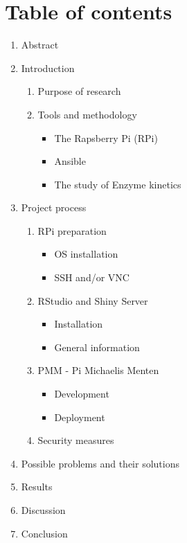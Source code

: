 \hypertarget{table-of-contents}{%
\section{Table of contents}\label{table-of-contents}}

\begin{enumerate}
\def\labelenumi{\arabic{enumi}.}
\tightlist
\item
  Abstract
\item
  Introduction

  \begin{enumerate}
  \def\labelenumii{\arabic{enumii}.}
  \tightlist
  \item
    Purpose of research
  \item
    Tools and methodology

    \begin{itemize}
    \tightlist
    \item
      The Rapsberry Pi (RPi)
    \item
      Ansible
    \item
      The study of Enzyme kinetics
    \end{itemize}
  \end{enumerate}
\item
  Project process

  \begin{enumerate}
  \def\labelenumii{\arabic{enumii}.}
  \tightlist
  \item
    RPi preparation

    \begin{itemize}
    \tightlist
    \item
      OS installation
    \item
      SSH and/or VNC
    \end{itemize}
  \item
    RStudio and Shiny Server

    \begin{itemize}
    \tightlist
    \item
      Installation
    \item
      General information
    \end{itemize}
  \item
    PMM - Pi Michaelis Menten

    \begin{itemize}
    \tightlist
    \item
      Development
    \item
      Deployment
    \end{itemize}
  \item
    Security measures
  \end{enumerate}
\item
  Possible problems and their solutions
\item
  Results
\item
  Discussion
\item
  Conclusion
\end{enumerate}

